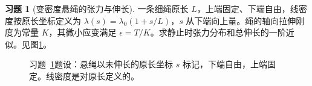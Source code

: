 \documentclass[11pt,openany,fontset=fandol]{ctexbook}
\theoremstyle{definition}\newtheorem{example}{例}[chapter]\newtheorem{exercise}{习题}[chapter]
\begin{document}
\par\medskip\noindent\begin{minipage}{\textwidth}
\begin{exercise}[变密度悬绳的张力与伸长]\label{mp1:pr:p9}
一条细绳原长 $L$，上端固定、下端自由，线密度按原长坐标定义为 $\lambda(s)=\lambda_0(1+s/L)$，$s$ 从下端向上量。绳的轴向拉伸刚度为常量 $K$，其微小应变满足 $\epsilon=T/K$。求静止时张力分布和总伸长的一阶近似。见图\ref{mp1:fig:p9-q}。
\end{exercise}

\begin{figure}[H]\centering

\caption{习题~\ref{mp1:pr:p9}题设：悬绳以未伸长的原长坐标 $s$ 标记，下端自由，上端固定。线密度是对原长定义的。}\label{mp1:fig:p9-q}
\end{figure}

\end{minipage}\par\medskip
\end{document}
